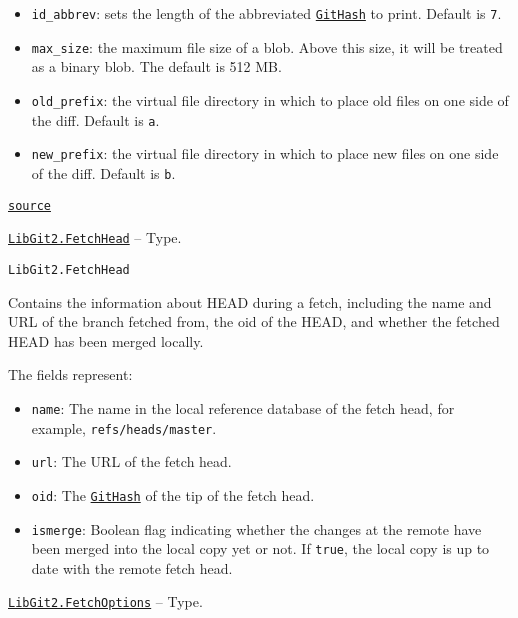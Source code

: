 \begin{adjustwidth}{2em}{0pt}
\begin{itemize}
\item \texttt{id\_abbrev}: sets the length of the abbreviated \hyperlink{202290709580230708}{\texttt{GitHash}} to print.  Default is \texttt{7}.


\item \texttt{max\_size}: the maximum file size of a blob. Above this size, it will be treated  as a binary blob. The default is 512 MB.


\item \texttt{old\_prefix}: the virtual file directory in which to place old files on one side  of the diff. Default is \texttt{{\textquotedbl}a{\textquotedbl}}.


\item \texttt{new\_prefix}: the virtual file directory in which to place new files on one side  of the diff. Default is \texttt{{\textquotedbl}b{\textquotedbl}}.

\end{itemize}


\href{https://github.com/JuliaLang/julia/blob/44fa15b1502a45eac76c9017af94332d4557b251/base/#L0-L30}{\texttt{source}}


\end{adjustwidth}
\hypertarget{17806809481919147110}{} 
\hyperlink{17806809481919147110}{\texttt{LibGit2.FetchHead}}  -- {Type.}

\begin{adjustwidth}{2em}{0pt}


\begin{verbatim}
LibGit2.FetchHead
\end{verbatim}

Contains the information about HEAD during a fetch, including the name and URL of the branch fetched from, the oid of the HEAD, and whether the fetched HEAD has been merged locally.

The fields represent:

\begin{itemize}
\item \texttt{name}: The name in the local reference database of the fetch head, for example,  \texttt{{\textquotedbl}refs/heads/master{\textquotedbl}}.


\item \texttt{url}: The URL of the fetch head.


\item \texttt{oid}: The \hyperlink{202290709580230708}{\texttt{GitHash}} of the tip of the fetch head.


\item \texttt{ismerge}: Boolean flag indicating whether the changes at the  remote have been merged into the local copy yet or not. If \texttt{true}, the local  copy is up to date with the remote fetch head.

\end{itemize}


\end{adjustwidth}
\hypertarget{7474664468985945267}{} 
\hyperlink{7474664468985945267}{\texttt{LibGit2.FetchOptions}}  -- {Type.}

